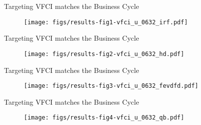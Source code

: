 \begin{frame}{Targeting VFCI matches the Business Cycle}

  \begin{figure}
    \texttt{[image: figs/results-fig1-vfci\_u\_0632\_irf.pdf]}
  \end{figure}

\end{frame}


\begin{frame}{Targeting VFCI matches the Business Cycle}

  \begin{figure}
    \texttt{[image: figs/results-fig2-vfci\_u\_0632\_hd.pdf]}
  \end{figure}

\end{frame}



\begin{frame}{Targeting VFCI matches the Business Cycle}

  \begin{figure}
    \texttt{[image: figs/results-fig3-vfci\_u\_0632\_fevdfd.pdf]}
  \end{figure}

\end{frame}

\begin{frame}{Targeting VFCI matches the Business Cycle}

  \begin{figure}
    \texttt{[image: figs/results-fig4-vfci\_u\_0632\_qb.pdf]}
  \end{figure}

\end{frame}
